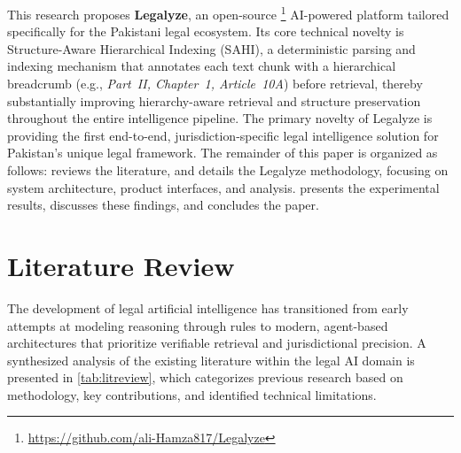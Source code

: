 This research proposes \textbf{Legalyze}, an open-source%
\footnote{\url{https://github.com/ali-Hamza817/Legalyze}} AI-powered platform tailored
specifically for the Pakistani legal ecosystem. Its core technical novelty is
Structure-Aware Hierarchical Indexing (SAHI), a deterministic parsing and indexing
mechanism that annotates each text chunk with a hierarchical breadcrumb (e.g.,
\emph{Part~II, Chapter~1, Article~10A}) before retrieval, thereby substantially improving
hierarchy-aware retrieval and structure preservation throughout the entire intelligence
pipeline.  The primary novelty
of Legalyze is providing the first end-to-end, jurisdiction-specific legal intelligence
solution for Pakistan's unique legal framework. The remainder of this paper is organized
as follows:  reviews the literature, and  details the
Legalyze methodology, focusing on system architecture, product interfaces, and analysis.
 presents the experimental results,  discusses
these findings, and  concludes the paper.


\section{Literature Review}
\label{sec:lit}

The development of legal artificial intelligence has transitioned from early attempts at
modeling reasoning through rules to modern, agent-based architectures that prioritize
verifiable retrieval and jurisdictional precision. A synthesized analysis of the existing
literature within the legal AI domain is presented in \cref{tab:litreview}, which
categorizes previous research based on methodology, key contributions, and identified
technical limitations.

